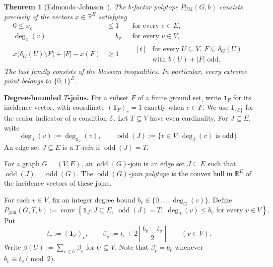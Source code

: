 \documentclass[11pt]{amsart}
\DeclareMathOperator{\odd}{odd}
\newcommand{\1}{\mathbbm{1}}
\newtheorem{theorem}{Theorem}[section]
\begin{document}
\begin{theorem}[Edmonds--Johnson~\cite{EdmondsJohnson}]
\label{thm:b-factor}
The $b$-factor polytope $P_{\mathrm{PM}}(G,b)$ consists precisely
of the vectors $x\in\mathbb{R}^{E}$ satisfying
\[
    \begin{aligned}
        0\le x_e &\le 1
        &&\text{for every }e\in E,\\[3pt]
        \deg_x(v) &= b_v
        &&\text{for every }v\in V,\\[3pt]
        x\bigl(\delta_G(U)\setminus F\bigr)+|F|-x(F) &\ge 1
        &&\begin{aligned}[t]
            &\text{for every }U\subseteq V,\ F\subseteq\delta_G(U)\\
            &\text{with }b(U)+|F|\text{ odd}.
        \end{aligned}
    \end{aligned}
\]
The last family consists of the \emph{blossom inequalities}.
In particular, every extreme point belongs to $\{0,1\}^{E}$.
\end{theorem}

\smallskip\noindent
\textbf{Degree-bounded $T$-joins.}
For a subset $F$ of a finite ground set, write $\mathbf{1}_F$ for
its incidence vector, with coordinate $(\mathbf{1}_F)_e=1$ exactly
when $e\in F$. We use $\mathbf{1}_{\{\mathcal E\}}$ for the scalar
indicator of a condition $\mathcal E$.
Let $T\subseteq V$ have even cardinality. For $J\subseteq E$, write
\[
    \deg_J(v):=\deg_{\mathbf{1}_{J}}(v),
    \qquad
    \odd(J):=\{v\in V:\deg_J(v)\text{ is odd}\}.
\]
An edge set $J\subseteq E$ is a \emph{$T$-join} if $\odd(J)=T$.

{For a graph $G=(V,E)$, an $\odd(G)$-join is an
edge set $J\subseteq E$ such that $\odd(J)=\odd(G)$.
The \emph{$\odd(G)$-join polytope} is the convex hull in
$\mathbb R^E$ of the incidence vectors of these joins.}

For each $v\in V$, fix an integer degree bound
$b_v\in\{0,\ldots,\deg_G(v)\}$. Define
\[
    P_{\mathrm{join}}(G,T,b)
    :=
    \operatorname{conv}
    \left\{
        \mathbf{1}_{J}:
        J\subseteq E,\;
        \odd(J)=T,\;
        \deg_J(v)\le b_v\text{ for every }v\in V
    \right\}.
\]
Put
\[
    t_v:=(\mathbf{1}_T)_v,
    \qquad
    \beta_v:=t_v+2\left\lfloor\frac{b_v-t_v}{2}\right\rfloor
    \qquad(v\in V).
\]
Write $\beta(U):=\sum_{v\in U}\beta_v$ for $U\subseteq V$.
Note that $\beta_v=b_v$ whenever
$b_v\equiv t_v\pmod 2$.
\end{document}
